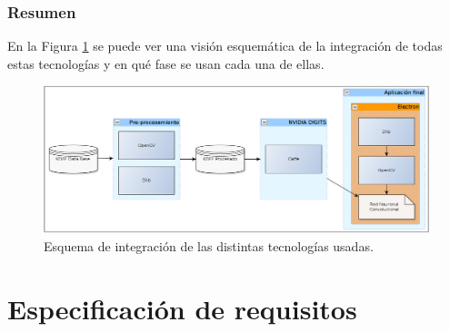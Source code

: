 \documentclass[a4paper,11pt]{book}
\begin{document}
\subsubsection{Resumen}
En la Figura \ref{fig:integracion} se puede ver una visión esquemática de la integración de todas estas tecnologías y en qué fase se usan cada una de ellas.
\begin{figure}[h]
\centering
\includegraphics[width=1.0\linewidth]{imagenes/integracion}
\caption[Integración]{Esquema de integración de las distintas tecnologías usadas.}
\label{fig:integracion}
\end{figure}


\section{Especificación de requisitos}






\end{document}
